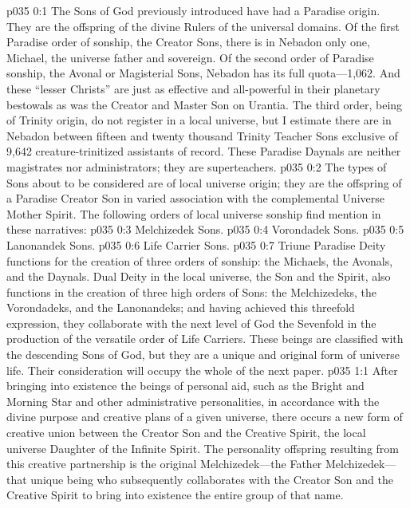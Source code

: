 \author{Chief of Archangels}
\vs p035 0:1 The Sons of God previously introduced have had a Paradise origin. They are the offspring of the divine Rulers of the universal domains. Of the first Paradise order of sonship, the Creator Sons, there is in Nebadon only one, Michael, the universe father and sovereign. Of the second order of Paradise sonship, the Avonal or Magisterial Sons, Nebadon has its full quota---1,062. And these “lesser Christs” are just as effective and all\hyp{}powerful in their planetary bestowals as was the Creator and Master Son on Urantia. The third order, being of Trinity origin, do not register in a local universe, but I estimate there are in Nebadon between fifteen and twenty thousand Trinity Teacher Sons exclusive of 9,642 creature\hyp{}trinitized assistants of record. These Paradise Daynals are neither magistrates nor administrators; they are superteachers.
\vs p035 0:2 The types of Sons about to be considered are of local universe origin; they are the offspring of a Paradise Creator Son in varied association with the complemental Universe Mother Spirit. The following orders of local universe sonship find mention in these narratives:
\pc \vs p035 0:3 \bibnobreakspace Melchizedek Sons.
\vs p035 0:4 \bibnobreakspace Vorondadek Sons.
\vs p035 0:5 \bibnobreakspace Lanonandek Sons.
\vs p035 0:6 \bibnobreakspace Life Carrier Sons.
\pc \vs p035 0:7 Triune Paradise Deity functions for the creation of three orders of sonship: the Michaels, the Avonals, and the Daynals. Dual Deity in the local universe, the Son and the Spirit, also functions in the creation of three high orders of Sons: the Melchizedeks, the Vorondadeks, and the Lanonandeks; and having achieved this threefold expression, they collaborate with the next level of God the Sevenfold in the production of the versatile order of Life Carriers. These beings are classified with the descending Sons of God, but they are a unique and original form of universe life. Their consideration will occupy the whole of the next paper.
\vs p035 1:1 After bringing into existence the beings of personal aid, such as the Bright and Morning Star and other administrative personalities, in accordance with the divine purpose and creative plans of a given universe, there occurs a new form of creative union between the Creator Son and the Creative Spirit, the local universe Daughter of the Infinite Spirit. The personality offspring resulting from this creative partnership is the original Melchizedek---the Father Melchizedek---that unique being who subsequently collaborates with the Creator Son and the Creative Spirit to bring into existence the entire group of that name.
